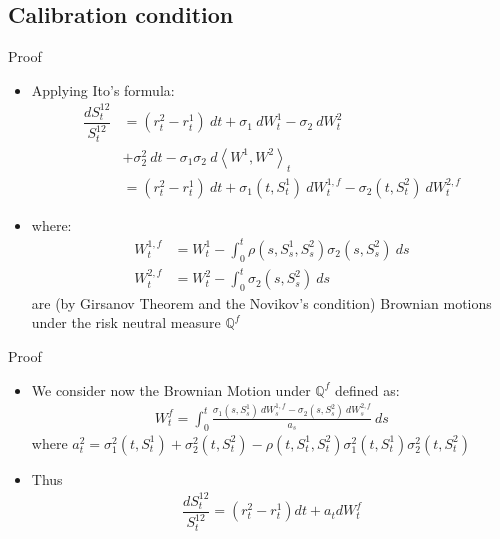 \documentclass[10pt]{beamer} %
\begin{document}
    \subsection{Calibration condition}
    \begin{frame}[t]{Proof}
    \begin{itemize}
    \item<+-> Applying Ito's formula:
    	\begin{align*}
        \dfrac{dS^{12}_{t}}{S^{12}_{t}}  &= (r_t^2 - r_t^1)\:dt + \sigma_1 \:dW_t^1 - \sigma_2 \: dW_t^2\\ 
        &+ \sigma_2^2 \:dt -\sigma_1\sigma_2 \: d \left\langle W^1,W^2 \right\rangle_t \\
         &= (r^{2}_t - r^{1}_t) \:dt + \sigma_1 \left(t, S^{1}_t \right)\:dW_t^{1,f} - \sigma_2(t, S_t^{2})\:dW_t^{2,f}
    	\end{align*}
    \item<+-> where:
    	\begin{align*}
    W_t^{1,f} &= W_t^{1} - \int_0^t \rho(s, S_s^{1}, S_s^{2}) \sigma_2(s, S_s^{2}) \: ds \\
W_t^{2,f} &= W_t^{2} - \int_0^t \sigma_2(s, S_s^{2}) \: ds
    	\end{align*}
    are (by Girsanov Theorem and the Novikov's condition) Brownian motions under the risk neutral measure $\mathbb{Q}^{f}$
	\end{itemize}
    \end{frame}
    \begin{frame}[t]{Proof}
    \begin{itemize}
    \item <+-> We consider now the Brownian Motion under $\mathbb{Q}^{f}$ defined as:
    \begin{align*}
    W_t^{f} = \int_0^{t}{ \frac{\sigma_1(s,S_s^1)\:dW_s^{1,f} - \sigma_2(s, S_s^{2})\:dW_s^{2,f}}{a_s} \:ds}
    \end{align*}
    where $a_t^2 = \sigma_1^2(t, S_t^1) + \sigma_2^2(t, S_t^2) - \rho(t, S_t^1, S_t^2)\sigma_1^2(t, S_t^1)\sigma_2^2(t, S_t^2)$
    \item<+->Thus
    \begin{align*}
    \dfrac{dS^{12}_{t}}{S^{12}_{t}} = (r_t^{2} - r_t^{1}) dt + a_t dW_t^f
    \end{align*}
    \end{itemize}
    \end{frame}
\end{document}
